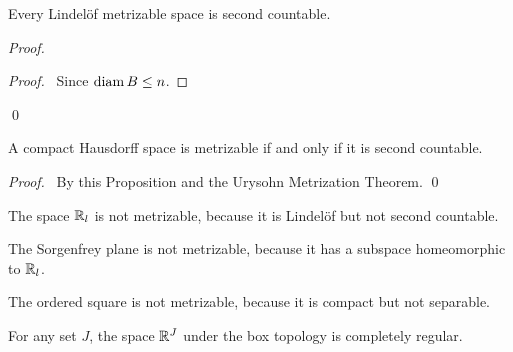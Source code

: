 \begin{proposition}[Choice]
    \label{proposition:Lindelof_metrizable_second_countable}
    Every Lindel\"{o}f metrizable space is second countable.
\end{proposition}

\begin{proof}
    \pf
    \begin{proof}
        \pf\ Since $\operatorname{diam} B \leq n$.
    \end{proof}
    \qed
\end{proof}

\begin{corollary}
    A compact Hausdorff space is metrizable if and only if it is second countable.
\end{corollary}

\begin{proof}
    \pf\ By this Proposition and the Urysohn Metrization Theorem. \qed
\end{proof}

\begin{example}
    The space $\mathbb{R}_l$ is not metrizable, because it is Lindel\"{o}f but not
    second countable.
\end{example}

\begin{corollary}
    The Sorgenfrey plane is not metrizable, because it has a subspace homeomorphic to $\mathbb{R}_l$.
\end{corollary}

\begin{example}
    The ordered square is not metrizable, because it is compact but not separable.
\end{example}

\begin{proposition}
    For any set $J$, the space $\mathbb{R}^J$ under the box topology is completely regular.
\end{proposition}

